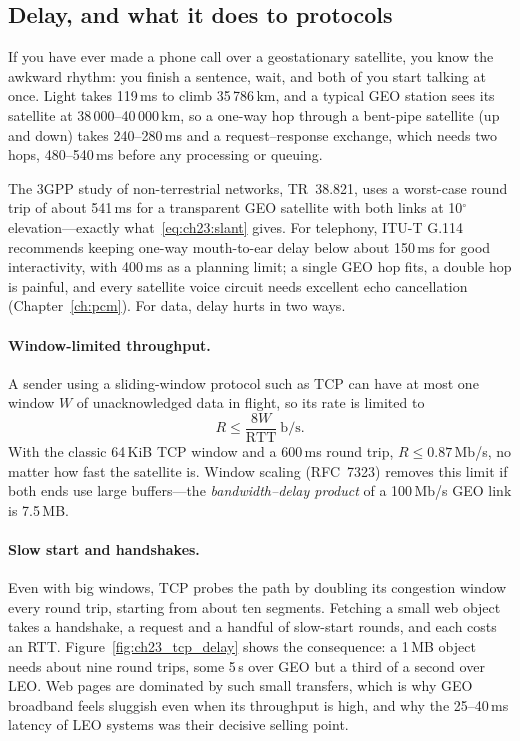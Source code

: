 \subsection{Delay, and what it does to protocols}

If you have ever made a phone call over a geostationary satellite, you know the awkward rhythm:
you finish a sentence, wait, and both of you start talking at once. Light takes 119\,ms to climb
35\,786\,km, and a typical GEO station sees its satellite at 38\,000--40\,000\,km, so a one-way hop
through a bent-pipe satellite (up and down) takes 240--280\,ms and a request--response exchange,
which needs two hops, 480--540\,ms before any processing or queuing.

The 3GPP study of non-terrestrial networks, TR~38.821, uses a worst-case round trip of about
541\,ms for a transparent GEO satellite with both links at 10$^\circ$ elevation---exactly
what~\eqref{eq:ch23:slant} gives. For telephony, ITU-T G.114 recommends keeping one-way
mouth-to-ear delay below about 150\,ms for good interactivity, with 400\,ms as a planning limit; a
single GEO hop fits, a double hop is painful, and every satellite voice circuit needs excellent
echo cancellation (Chapter~\ref{ch:pcm}). For data, delay hurts in two ways.

\paragraph{Window-limited throughput.} A sender using a sliding-window protocol such as TCP
can have at most one window $W$ of unacknowledged data in flight, so its rate is limited to
\begin{equation}
R\le\frac{8W}{\text{RTT}}\ \text{b/s}.
\label{eq:ch23:tcpwindow}
\end{equation}
With the classic 64\,KiB TCP window and a 600\,ms round trip, $R\le0.87$\,Mb/s, no matter how
fast the satellite is. Window scaling (RFC~7323) removes this limit if both ends use large
buffers---the \emph{bandwidth--delay product} of a 100\,Mb/s GEO link is 7.5\,MB.

\paragraph{Slow start and handshakes.} Even with big windows, TCP probes the path by doubling
its congestion window every round trip, starting from about ten segments. Fetching a small
web object takes a handshake, a request and a handful of slow-start rounds, and each costs an
RTT. Figure~\ref{fig:ch23_tcp_delay} shows the consequence: a 1\,MB object needs about nine
round trips, some 5\,s over GEO but a third of a second over LEO. Web pages are dominated by such
small transfers, which is why GEO broadband feels sluggish even when its throughput is high,
and why the 25--40\,ms latency of LEO systems was their decisive selling point.

